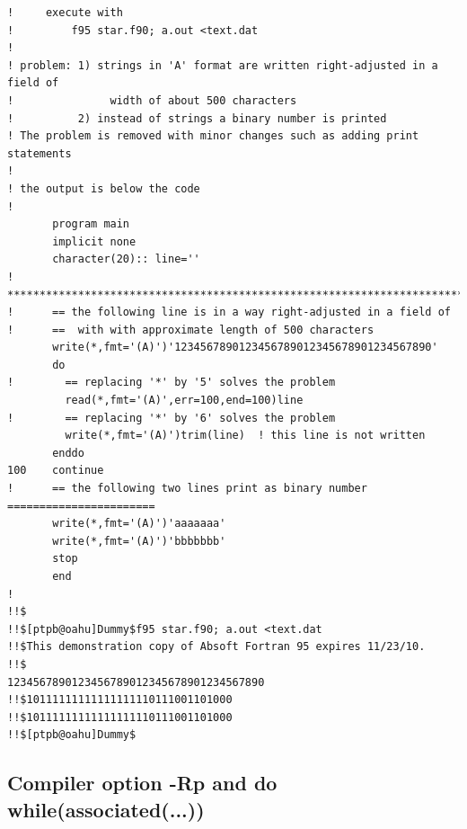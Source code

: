 \documentclass[a4paper,10pt]{report}
\begin{document}
\begin{verbatim}
!     execute with 
!         f95 star.f90; a.out <text.dat
!
! problem: 1) strings in 'A' format are written right-adjusted in a field of 
!               width of about 500 characters 
!          2) instead of strings a binary number is printed
! The problem is removed with minor changes such as adding print statements
!
! the output is below the code
!
       program main
       implicit none
       character(20):: line=''
!      *************************************************************************
!      == the following line is in a way right-adjusted in a field of
!      ==  with with approximate length of 500 characters
       write(*,fmt='(A)')'1234567890123456789012345678901234567890'
       do
!        == replacing '*' by '5' solves the problem 
         read(*,fmt='(A)',err=100,end=100)line
!        == replacing '*' by '6' solves the problem 
         write(*,fmt='(A)')trim(line)  ! this line is not written
       enddo  
100    continue
!      == the following two lines print as binary number =======================
       write(*,fmt='(A)')'aaaaaaa'    
       write(*,fmt='(A)')'bbbbbbb'
       stop
       end
!
!!$
!!$[ptpb@oahu]Dummy$f95 star.f90; a.out <text.dat
!!$This demonstration copy of Absoft Fortran 95 expires 11/23/10.
!!$                                                                                                                                                                                                                                                                                                                                                                1234567890123456789012345678901234567890
!!$10111111111111111110111001101000
!!$10111111111111111110111001101000
!!$[ptpb@oahu]Dummy$

\end{verbatim}


\subsection{Compiler option -Rp and do while(associated(...))}
\end{document}
